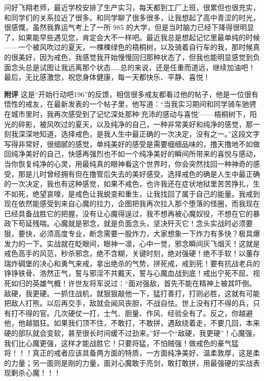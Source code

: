 \begin{case}
    问好飞翔老师，最近学校安排了生产实习，每天都到工厂上班，很累但也很充实，和同学们的关系拉近了很多。和同学聊了很多很多，让我想起了高中青涩的时光，很感慨，虽然我靠运气考上了一所 985 的大学，但是当时脑力已经下降得很明显了，如果能早些遇见您，肯定会大不一样吧。最近我总是想起记忆里最单纯的时候——一个被风吹过的夏天，一棵棵绿色的梧桐树，以及骑着自行车的我，那时候真的很美好，因为戒色，我感觉我开始慢慢回归那种状态了，但我也能明显感觉到负面念头总是试图让我远离那个状态……总的来说，还是任重而道远，继续加油吧！最后，无比感激您，祝您身体健康，每一天都快乐、平静、喜悦！

    \textbf{附评} 这是“开始行动吧196”的反馈，相信很多戒友都看过他的帖子，他是一位很有悟性的戒友，在最新发表的一个帖子里，他写道：“当我实习期间和同学骑车驰骋在城市里时，我再次感受到了记忆深处那种‘充沛的感动与喜悦’——梧桐树下，阳光的碎影，被风吹过的夏天，以及纯净的自己，一种非常美好和纯净的感觉，那一刻我深深地知道，选择戒色，是我人生中最正确的一次决定，没有之一。”这段文字写得非常好，很细腻的感觉，单纯美好的感受是需要细细品味的，撸天撸地不如做回纯净美好的自己，快感再强烈也不如一个纯净美好的瞬间所带来的喜悦与感动，当你恢复纯净的心灵，用最纯真的眼神看这个世界时，你会突然找回一种神奇的感受，那是儿时曾经拥有但在撸管后失去的美好感受。选择戒色的确是人生中最正确的一次决定，我也有这种感觉，如果不戒色，也许我还在症状地狱里苦苦挣扎，生不如死，绝望哀嚎，是戒色让我蜕变和重生，让我找回了属于自己的能量。我戒到现在依然能感受到来自心魔的拉力，企图把我再次拉入那个堕落的怪圈，而我现在已经具备战胜它的把握，没有让心魔得逞过，我不想再被心魔奴役，不想在它的暴政下苟延残喘。心魔就是邪念，就是负面念头，坚决歼灭它！念头实战时必须要狠，要快，必须高度专业，断念需要一股炸力，大家想象一下炸力有多快？极具爆发力的一下。实战就在眨眼间，眼神一凛，心中一觉，邪念瞬间灰飞烟灭！这就是戒色高手的风范，秒杀邪念，绝不含糊，关键时刻，绝对强硬！绝不手软！以董存瑞炸碉堡的决心和勇气来戒，拿出绝杀的气势，拼死戒，戒到死！要有抗战老兵的铮铮铁骨、浩然正气，誓与邪淫不共戴天，誓与心魔血战到底！戒出宁死不屈、视死如归的英雄气概！许世友将军说过：“面对强敌，首先不能在精神上被其吓倒。敌硬，我更硬。一抓住战机，就狠狠敲他一下，猛打善打，打则必胜，这就有可能把敌人打熊。以后再交手，敌就会闻风丧胆，不战自怯。世上没有打不得的兵，只有打不得的官。几次硬仗一打，士气、胆量、作风、经验全有了。反之，你越避他，他越猖狂。如果我们顶不住，不敢打，不敢拼，遇敌绕着走，不要几回，本来硬的部队就会变软，甚至很长时间缓不过劲来。”好一个“敌硬，我更硬”！心魔强，我们比心魔更强，这样才能战胜它！只要将猛，不怕贼强！做戒色的豪气猛将！！！真正的戒者应该具备两方面的特质，一方面纯净美好、温柔敦厚，这是柔的力量；另一面则是刚的力量，面对心魔敢于亮剑，敢打敢拼，用最强硬的实战表现剿杀心魔！！！
\end{case}

